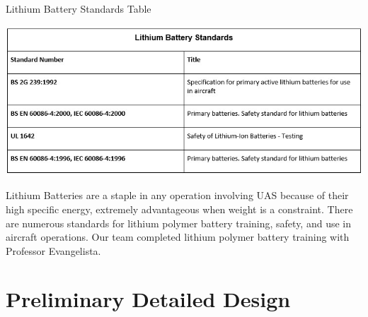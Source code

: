 \documentclass{wrcecapstone}
\begin{document}
\begin{table}
\caption{Lithium Battery Standards Table \cite{mpoweruk2019international}}
\label{tab:6.1}
\begin{center}
\includegraphics[width=\columnwidth]{figures/table-61.jpg}
\end{center}
\end{table}

Lithium Batteries are a staple in any operation involving UAS because of their high specific energy, extremely advantageous when weight is a constraint. There are numerous standards for lithium polymer battery training, safety, and use in aircraft operations. Our team completed lithium polymer battery training with Professor Evangelista.






\section{Preliminary Detailed Design}
\end{document}
